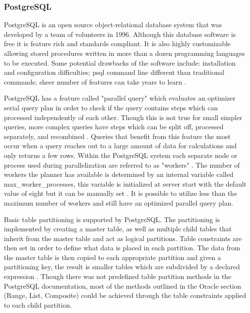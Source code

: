 \documentclass[draftclsnofoot, onecolumn, compsoc, 10pt]{IEEEtran}
\begin{document}
\subsubsection{PostgreSQL}
PostgreSQL is an open source object-relational database system that was developed by a team of volunteers in 1996.
Although this database software is free it is feature rich and standards compliant.
It is also highly customizable allowing stored procedures written in more than a dozen programming languages to be executed.
Some potential drawbacks of the software include: installation and configuration difficulties; psql command line different than traditional commands; sheer number of features can take years to learn \cite{General Information - PostegreSQL}.

PostgreSQL has a feature called "parallel query" which evaluates an optimizer serial query plan in order to check if the query contains steps which can processed independently of each other.
Though this is not true for small simpler queries, more complex queries have steps which can be split off, processed separately, and recombined \cite{Documentation: 9.6: Parallel Query}.
Queries that benefit from this feature the most occur when a query reaches out to a large amount of data for calculations and only returns a few rows.
Within the PostgreSQL system each separate node or process used during parallelization are referred to as "workers" .
The number of workers the planner has available is determined by an internal variable called max\_worker\_processes, this variable is initialized at server start with the default value of eight but it can be manually set \cite{Documentation: 9.6: Parallel Query}.
It is possible to utilize less than the maximum number of workers and still have an optimized parallel query plan.

Basic table partitioning is supported by PostgreSQL.
The partitioning is implemented by creating a master table, as well as multiple child tables that inherit from the master table and act as logical partitions.
Table constraints are then set in order to define what data is placed in each partition.
The data from the master table is then copied to each appropriate partition and given a partitioning key, the result is smaller tables which are subdivided by a declared expression \cite{Documentation: 9.1: Partitioning}.
Though there was not predefined table partition methods in the PostgreSQL documentation, most of the methods outlined in the Oracle section (Range, List, Composite) could be achieved through the table constraints applied to each child partition.  
\end{document}
